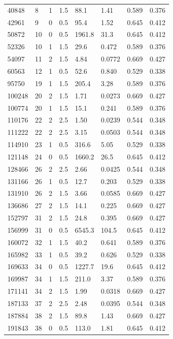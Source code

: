 \documentclass[preview]{standalone}
\begin{document}
{{\begin{tabular}{L{1.2cm}C{1.2cm} C{0.3cm}C{0.5cm} C{1.4cm}C{1.4cm} C{1.4cm}C{1.4cm}}
  40848  &     8  & 1     & 1.5 &  88.1  & 1.41  & 0.589 &  0.376   \\ 
  42961  &     9  & 0     & 0.5 &  95.4  & 1.52  & 0.645 &  0.412   \\ 
  50872  &    10  & 0     & 0.5 &  1961.8  & 31.3  & 0.645 &  0.412   \\ 
  52326  &    10  & 1     & 1.5 &  29.6  & 0.472  & 0.589 &  0.376   \\ 
  54097  &    11  & 2     & 1.5 &  4.84  & 0.0772  & 0.669 &  0.427   \\ 
  60563  &    12  & 1     & 0.5 &  52.6  & 0.840  & 0.529 &  0.338   \\ 
  95750  &    19  & 1     & 1.5 &  205.4  & 3.28  & 0.589 &  0.376   \\ 
  100248  &    20  & 2     & 1.5 &  1.71  & 0.0273  & 0.669 &  0.427   \\ 
  100774  &    20  & 1     & 1.5 &  15.1  & 0.241  & 0.589 &  0.376   \\ 
  110176  &    22  & 2     & 2.5 &  1.50  & 0.0239  & 0.544 &  0.348   \\ 
  111222  &    22  & 2     & 2.5 &  3.15  & 0.0503  & 0.544 &  0.348   \\ 
  114910  &    23  & 1     & 0.5 &  316.6  & 5.05  & 0.529 &  0.338   \\ 
  121148  &    24  & 0     & 0.5 &  1660.2  & 26.5  & 0.645 &  0.412   \\ 
  128466  &    26  & 2     & 2.5 &  2.66  & 0.0425  & 0.544 &  0.348   \\ 
  131166  &    26  & 1     & 0.5 &  12.7  & 0.203  & 0.529 &  0.338   \\ 
  131910  &    26  & 2     & 1.5 &  3.66  & 0.0585  & 0.669 &  0.427   \\ 
  136686  &    27  & 2     & 1.5 &  14.1  & 0.225  & 0.669 &  0.427   \\ 
  152797  &    31  & 2     & 1.5 &  24.8  & 0.395  & 0.669 &  0.427   \\ 
  156999  &    31  & 0     & 0.5 &  6545.3  & 104.5  & 0.645 &  0.412   \\ 
  160072  &    32  & 1     & 1.5 &  40.2  & 0.641  & 0.589 &  0.376   \\ 
  165982  &    33  & 1     & 0.5 &  39.2  & 0.626  & 0.529 &  0.338   \\ 
  169633  &    34  & 0     & 0.5 &  1227.7  & 19.6  & 0.645 &  0.412   \\ 
  169987  &    34  & 1     & 1.5 &  211.0  & 3.37  & 0.589 &  0.376   \\ 
  171141  &    34  & 2     & 1.5 &  1.99  & 0.0318  & 0.669 &  0.427   \\ 
  187133  &    37  & 2     & 2.5 &  2.48  & 0.0395  & 0.544 &  0.348   \\ 
  187884  &    38  & 2     & 1.5 &  89.8  & 1.43  & 0.669 &  0.427   \\ 
  191843  &    38  & 0     & 0.5 &  113.0  & 1.81  & 0.645 &  0.412   \\ 
\hline 
\end{tabular} 

}}
\end{document}
